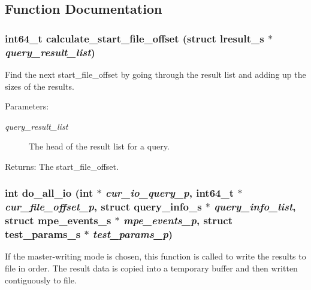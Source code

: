 \subsection{Function Documentation}
\subsubsection{\setlength{\rightskip}{0pt plus 5cm}int64\_\-t calculate\_\-start\_\-file\_\-offset (struct \bf{lresult\_\-s} $\ast$ {\em query\_\-result\_\-list})}\label{master__help_8h_cd2ffec0ba4d23b5d523d264c2b3dd4f}


Find the next start\_\-file\_\-offset by going through the result list and adding up the sizes of the results.

\begin{Desc}
\item[Parameters:]
\begin{description}
\item[{\em query\_\-result\_\-list}]The head of the result list for a query. \end{description}
\end{Desc}
\begin{Desc}
\item[Returns:]The start\_\-file\_\-offset. \end{Desc}
\subsubsection{\setlength{\rightskip}{0pt plus 5cm}int do\_\-all\_\-io (int $\ast$ {\em cur\_\-io\_\-query\_\-p}, int64\_\-t $\ast$ {\em cur\_\-file\_\-offset\_\-p}, struct \bf{query\_\-info\_\-s} $\ast$ {\em query\_\-info\_\-list}, struct \bf{mpe\_\-events\_\-s} $\ast$ {\em mpe\_\-events\_\-p}, struct \bf{test\_\-params\_\-s} $\ast$ {\em test\_\-params\_\-p})}\label{master__help_8h_6153ffcafb3a84ad93ec8646bdecb7f3}


If the master-writing mode is chosen, this function is called to write the results to file in order. The result data is copied into a temporary buffer and then written contiguously to file.

